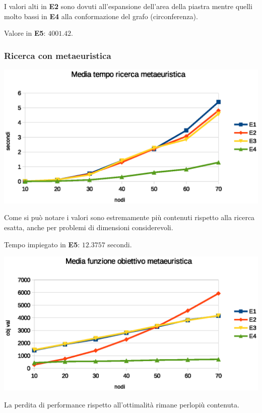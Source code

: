 \documentclass[a4paper]{article}
\begin{document}
                I valori alti in \textbf{E2} sono dovuti all'espansione dell'area della piastra mentre quelli molto bassi in \textbf{E4} alla
                conformazione del grafo (circonferenza).

                Valore in \textbf{E5}: $4001.42$.

            \subsubsection{Ricerca con metaeuristica}

                    \includegraphics[scale=0.7]{img/gavgtime}

                    Come si pu\`o notare i valori sono estremamente pi\`u contenuti rispetto alla ricerca esatta, anche per problemi di dimensioni
                    considerevoli.

                    Tempo impiegato in \textbf{E5}: $12.3757$ secondi.

                    \includegraphics[scale=0.7]{img/gavgobj}

                    La perdita di performance rispetto all'ottimalit\`a rimane perlopi\`u contenuta.
\end{document}
